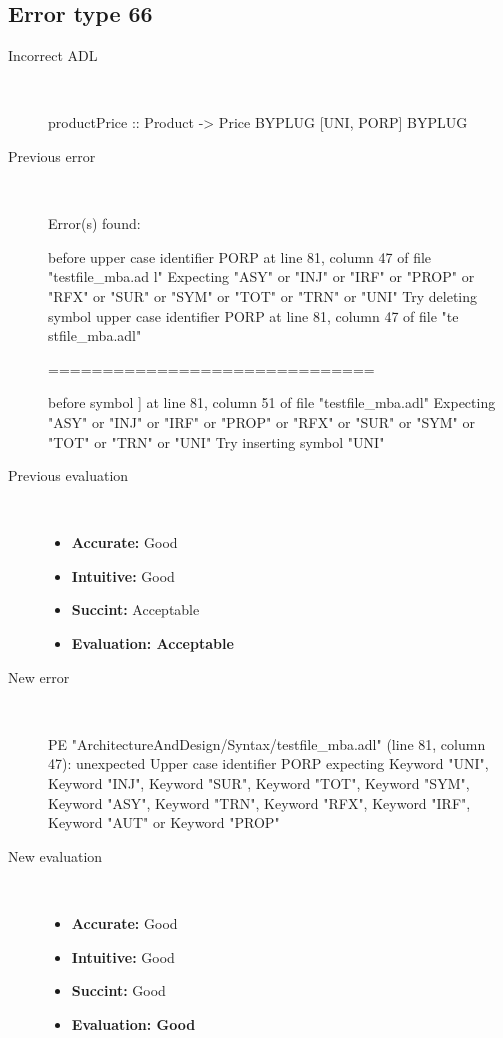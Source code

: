 \hrulefill

\subsection{Error type 66}
  \begin{description}
  \item[Incorrect ADL]~\\
\begin{adl}
productPrice :: Product -> Price BYPLUG [UNI, PORP] BYPLUG \end{adl}
  \item[Previous error]~\\
\begin{haskell}
Error(s) found:

before upper case identifier PORP at line 81, column 47 of file "testfile_mba.ad
l"
Expecting "ASY" or "INJ" or "IRF" or "PROP" or "RFX" or "SUR" or "SYM" or "TOT"
or "TRN" or "UNI"
Try deleting symbol upper case identifier PORP at line 81, column 47 of file "te
stfile_mba.adl"

==============================

before symbol ] at line 81, column 51 of file "testfile_mba.adl"
Expecting "ASY" or "INJ" or "IRF" or "PROP" or "RFX" or "SUR" or "SYM" or "TOT"
or "TRN" or "UNI"
Try inserting symbol "UNI"

\end{haskell}
  \item[Previous evaluation]~\\
    \begin{itemize}
    \item \textbf{Accurate:} Good
    \item \textbf{Intuitive:} Good
    \item \textbf{Succint:} Acceptable
    \item \textbf{Evaluation: Acceptable}
    \end{itemize}
  \item[New error]~\\
\begin{haskell}
PE "ArchitectureAndDesign/Syntax/testfile_mba.adl" (line 81, column 47):
unexpected Upper case identifier PORP
expecting Keyword "UNI", Keyword "INJ", Keyword "SUR", Keyword "TOT", Keyword "SYM", Keyword "ASY", Keyword "TRN", Keyword "RFX", Keyword "IRF", Keyword "AUT" or Keyword "PROP"\end{haskell}
  \item[New evaluation]~\\
    \begin{itemize}
    \item \textbf{Accurate:} Good
    \item \textbf{Intuitive:} Good
    \item \textbf{Succint:} Good
    \item \textbf{Evaluation: Good
}
    \end{itemize}
  \end{description}

